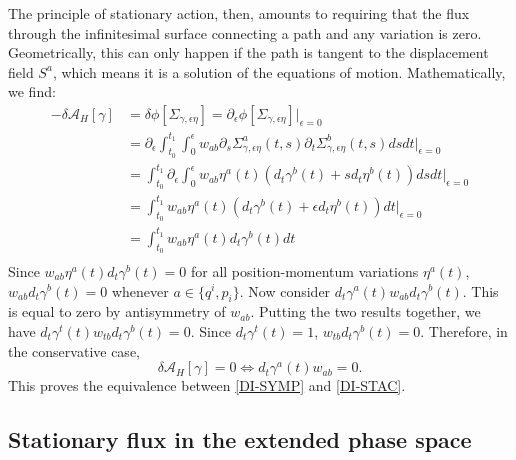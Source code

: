 \documentclass[nofootinbib,aps,pre]{revtex4-2}
\begin{document}
The principle of stationary action, then, amounts to requiring that the flux through the infinitesimal surface connecting a path and any variation is zero. Geometrically, this can only happen if the path is tangent to the displacement field $S^a$, which means it is a solution of the equations of motion. Mathematically, we find:
\begin{equation}\label{variationOnFlux}
	\begin{aligned}
		- \delta \mathcal{A}_H[\gamma] &=
		\delta\phi[\Sigma_{\gamma,\epsilon\eta}]= \partial_\epsilon \phi[\Sigma_{\gamma,\epsilon\eta}]|_{\epsilon=0} \\
		&= \partial_{\epsilon} \int_{t_0}^{t_1} \int_0^{\epsilon} w_{ab} \partial_s \Sigma^a_{\gamma, \epsilon \eta}(t,s) \partial_t \Sigma^b_{\gamma, \epsilon \eta}(t,s) ds dt |_{\epsilon=0} \\
		&= \int_{t_0}^{t_1} \partial_{\epsilon} \int_0^{\epsilon} w_{ab} \eta^a(t) (d_t \gamma^b(t) + s d_t \eta^b(t) ) ds dt |_{\epsilon=0} \\
		&= \int_{t_0}^{t_1} w_{ab} \eta^a(t) (d_t \gamma^b(t) + \epsilon d_t \eta^b(t)) dt |_{\epsilon=0} \\
		&= \int_{t_0}^{t_1} w_{ab} \eta^a(t) d_t \gamma^b(t) dt \\
	\end{aligned}
\end{equation}
Since $w_{ab} \eta^a(t) d_t \gamma^b(t) = 0$ for all position-momentum variations $\eta^a(t)$, $w_{ab} d_t \gamma^b(t) = 0$ whenever $a \in \{q^i, p_i\}$. Now consider $d_t \gamma^a(t) w_{ab} d_t \gamma^b(t)$. This is equal to zero by antisymmetry of $w_{ab}$. Putting the two results together, we have $d_t \gamma^t(t) w_{tb} d_t \gamma^b(t) = 0$. Since $d_t \gamma^t(t) = 1$, $w_{tb} d_t \gamma^b(t) = 0$. Therefore, in the conservative case, 
\begin{equation}
	\delta \mathcal{A}_H[\gamma] = 0 \iff d_t \gamma^a(t) w_{ab} = 0.
\end{equation}
This proves the equivalence between \ref{DI-SYMP} and \ref{DI-STAC}.

\subsection{Stationary flux in the extended phase space}
\end{document}
